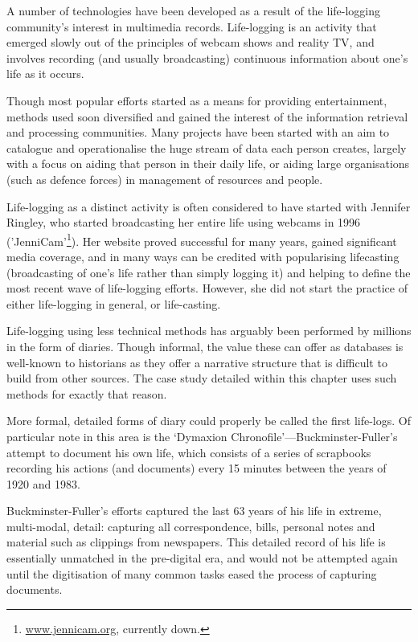 A number of technologies have been developed as a result of the life-logging community's interest in multimedia records.  Life-logging is an activity that emerged slowly out of the principles of webcam shows and reality TV, and involves recording (and usually broadcasting) continuous information about one's life as it occurs.

Though most popular efforts started as a means for providing entertainment, methods used soon diversified and gained the interest of the information retrieval and processing communities.  Many projects have been started with an aim to catalogue and operationalise the huge stream of data each person creates, largely with a focus on aiding that person in their daily life, or aiding large organisations (such as defence forces) in management of resources and people.





Life-logging as a distinct activity is often considered to have started with Jennifer Ringley, who started broadcasting her entire life using webcams in 1996 ('JenniCam'\footnote{\url{www.jennicam.org}, currently down.}).  Her website proved successful for many years, gained significant media coverage, and in many ways can be credited with popularising lifecasting (broadcasting of one's life rather than simply logging it) and helping to define the most recent wave of life-logging efforts.  However, she did not start the practice of either life-logging in general, or life-casting.


Life-logging using less technical methods has arguably been performed by millions in the form of diaries.  Though informal, the value these can offer as databases is well-known to historians as they offer a narrative structure that is difficult to build from other sources. The case study detailed within this chapter uses such methods for exactly that reason.


More formal, detailed forms of diary could properly be called the first life-logs.  Of particular note in this area is the `Dymaxion Chronofile'\cite{buckminsterFullerPapers}---Buckminster-Fuller's attempt to document his own life, which consists of a series of scrapbooks recording his actions (and documents) every 15 minutes between the years of 1920 and 1983.

Buckminster-Fuller's efforts captured the last 63 years of his life in extreme, multi-modal, detail: capturing all correspondence, bills, personal notes and material such as clippings from newspapers.  This detailed record of his life is essentially unmatched in the pre-digital era, and would not be attempted again until the digitisation of many common tasks eased the process of capturing documents.



